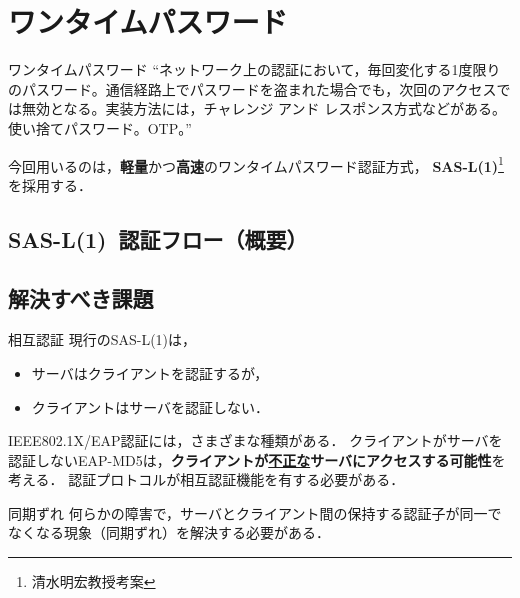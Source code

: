 \section{ワンタイムパスワード}
\toc
\begin{frame}[c]{\fft}
    \begin{block}{ワンタイムパスワード}
        ``ネットワーク上の認証において，毎回変化する1度限りのパスワード。通信経路上でパスワードを盗まれた場合でも，次回のアクセスでは無効となる。実装方法には，チャレンジ アンド レスポンス方式などがある。使い捨てパスワード。OTP。''
    \end{block}
    \vfill
    今回用いるのは，\textbf{軽量}かつ\textbf{高速}のワンタイムパスワード認証方式，\textbf{\color{red} SAS-L(1)}\footnote{清水明宏教授考案}を採用する．
\end{frame}
\subsection{SAS-L(1)\ 認証フロー（概要）}
\begin{frame}{\ft}
    
\end{frame}
\subsection{解決すべき課題}
\begin{frame}[t]{\ft}
    \begin{alertblock}{相互認証\hfill\textbf{}}
        現行のSAS-L(1)は，
        \begin{itemize}
            \item サーバはクライアントを認証するが，
            \item クライアントはサーバを認証しない．
        \end{itemize}
        IEEE802.1X/EAP認証には，さまざまな種類がある．
        クライアントがサーバを認証しないEAP-MD5は，\textbf{クライアントが\underline{不正な}サーバにアクセスする可能性}を考える．
        認証プロトコルが相互認証機能を有する必要がある．
    \end{alertblock}
    \begin{alertblock}{同期ずれ\hfill\textbf{}}
        何らかの障害で，サーバとクライアント間の保持する認証子が同一でなくなる現象（同期ずれ）を解決する必要がある．
    \end{alertblock}
\end{frame}